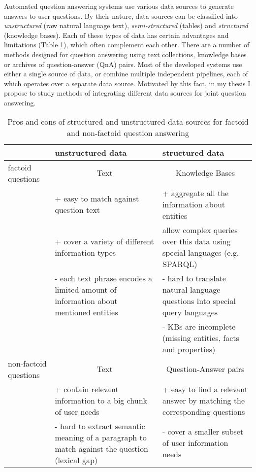 Automated question answering systems use various data sources to generate answers to user questions.
By their nature, data sources can be classified into \textit{unstructured} (\eg raw natural language text), \textit{semi-structured} (\eg tables) and \textit{structured} (\eg knowledge bases).
Each of these types of data has certain advantages and limitations (Table \ref{table:data_procons}), which often complement each other.
There are a number of methods designed for question answering using text collections, knowledge bases or archives of question-answer (QnA) pairs.
Most of the developed systems use either a single source of data, or combine multiple independent pipelines, each of which operates over a separate data source.
Motivated by this fact, in my thesis I propose to study methods of integrating different data sources for joint question answering.

\begin{table}
\centering
\begin{tabular}{| l | p{6cm} | p{6cm} |}
\hline
 & unstructured data & structured data \\
\hline
factoid questions & \multicolumn{1}{|c|}{Text} & \multicolumn{1}{|c|}{Knowledge Bases} \\
 & + easy to match against question text & + aggregate all the information about entities\\
 & + cover a variety of different information types & allow complex queries over this data using special languages (e.g. SPARQL) \\
 & - each text phrase encodes a limited amount of information about mentioned entities & - hard to translate natural language questions into special query languages \\
&  & - KBs are incomplete (missing entities, facts and properties) \\
\hline
non-factoid questions & \multicolumn{1}{|c|}{Text} & \multicolumn{1}{|c|}{Question-Answer pairs} \\
 & + contain relevant information to a big chunk of user needs & + easy to find a relevant answer by matching the corresponding questions \\
 & - hard to extract semantic meaning of a paragraph to match against the question (lexical gap) & - cover a smaller subset of user information needs \\
\hline
\end{tabular}
\caption{Pros and cons of structured and unstructured data sources for factoid and non-factoid question answering}
\label{table:data_procons}
\end{table}


